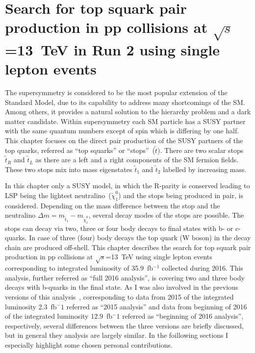 \chapter{Search for top squark pair production in pp collisions at $\sqrt{s}$=13~TeV in Run 2 using single lepton events}


The supersymmetry is considered to be the most popular extension of the Standard Model, due to its capability to address many shortcomings of the SM. Among others, it provides a natural solution to the hierarchy problem and a dark matter candidate. Within supersymmetry each SM particle has a SUSY partner with the same quantum numbers except of spin which is differing by one half. This chapter focuses on the direct pair production of the SUSY partners of the top quarks, referred as ``top squarks'' or ``stops''~($\tilde{t}$). There are two scalar stops $\tilde{t}_{R}$ and  $\tilde{t}_{L}$ as there are a left and a right components of the SM fermion fields. These two stops mix into mass eigenstates $\tilde{t}_{1}$ and $\tilde{t}_{2}$ labelled by increasing mass. 

In this chapter only a SUSY model, in which the R-parity is conserved leading to LSP being the lightest neutralino~($\tilde{\chi}^{0}_{1}$) and the stops being produced  in pair, is considered. Depending on the mass difference between the stop and the neutralino $\Delta m = m_{\tilde{t}_{1}} - m_{\tilde{\chi}^{0}_{1}}$, several decay modes of the stops are possible. The stops can decay via two, three or four body decays to final states with b- or c-quarks. In case of three (four) body decays the top quark (W boson) in the decay chain are produced off-shell. This chapter describes the search for top squark pair production in pp collisions at $\sqrt{s}$=13~TeV using single lepton events~\cite{Sirunyan:2017xse} corresponding to integrated luminosity of 35.9~fb$^{-1}$ collected during 2016. This analysis, further referred as ``full 2016 analysis'', is covering two and three body decays with b-quarks in the final state. As I was also involved in the previous versions of this analysis~\cite{Sirunyan:2016jpr, CMS:2016vew}, corresponding to data from 2015 of the integrated luminosity 2.3~fb$^-1$ referred as ``2015 analysis'' and data from beginning of 2016 of the integrated luminosity 12.9~fb$^-1$ referred as ``beginning of 2016 analysis'', respectively, several differences between the three versions are briefly discussed, but in general they analysis are largely similar. In the foillowing sections I especially highlight some chosen personal contributions.

